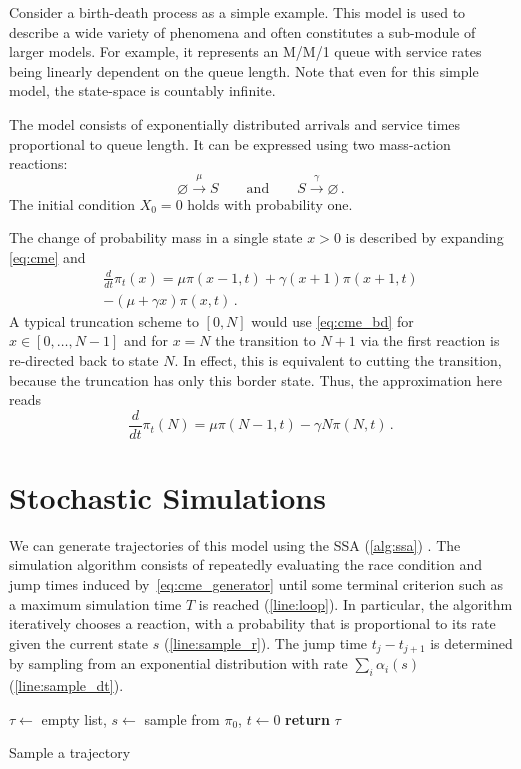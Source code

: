 \begin{example} Consider a birth-death process as a simple example. This model is used to describe a wide variety of phenomena and often constitutes a sub-module of larger models.
For example, it represents an M/M/1 queue with service rates being linearly dependent on the queue length.
Note that even for this simple model, the state-space is countably infinite.
\begin{model}\label{model:bd}
The model consists of exponentially distributed arrivals and service times proportional to queue length. It can be expressed using two mass-action reactions:
	\[ \varnothing \xrightarrow{\mu} S \qquad\text{and}\qquad S \xrightarrow{\gamma} \varnothing\,.\]
The initial condition $X_0=0$ holds with probability one.
\end{model}
The change of probability mass in a single state $x>0$ is described by expanding
\eqref{eq:cme} and
\begin{multline}\label{eq:cme_bd}
	\frac{d}{dt}\pi_t(x)=\mu \pi(x-1, t) + \gamma (x+1) \pi(x+1, t)\\
	- (\mu + \gamma x)\pi(x, t)\,.
\end{multline}
A typical truncation scheme to $[0, N]$ would use \eqref{eq:cme_bd} for $x\in[0,\dotsc,N - 1]$
and for $x=N$ the transition to $N+1$ via the first reaction is re-directed back to state $N$.
In effect, this is equivalent to cutting the transition, because the truncation has only this border state.
Thus, the approximation here reads
\[
	\frac{d}{dt}\pi_t(N)=\mu \pi(N-1, t) - \gamma N\pi(N, t)\,.
\]
\end{example}

\section{Stochastic Simulations}\label{sec:ssa}
We can generate trajectories of this model using the \acf{SSA} (\autoref{alg:ssa})  \cite{gillespie1977exact}.
The simulation algorithm consists of repeatedly evaluating the race condition and jump times induced by~\eqref{eq:cme_generator} until some terminal criterion such as a maximum simulation time $T$ is reached (\autoref{line:loop}).
In particular, the algorithm iteratively chooses a reaction, with a probability that is
proportional to its rate given the current state $s$ (\autoref{line:sample_r}).
The jump time $t_j- t_{j+1}$ is determined by sampling from an exponential distribution with rate $\sum_i\alpha_i(s)$ (\autoref{line:sample_dt}).
\begin{algorithm}
    $\tau \leftarrow$ empty list, $s\leftarrow$ sample from $\pi_0$, $t\leftarrow 0$\;
    \textbf{return} $\tau$\;
    \caption{\label{alg:ssa}Sample a trajectory}
\end{algorithm}

